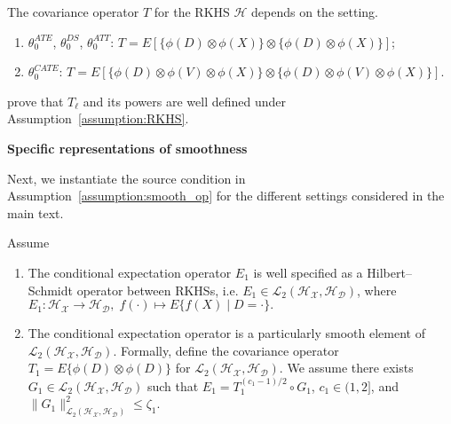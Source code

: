 \begin{remark}
The covariance operator $T$ for the RKHS $\mathcal{H}$ depends on the setting.
    \begin{enumerate}
        \item $\theta_0^{ATE}$, $\theta_0^{DS}$, $\theta_0^{ATT}$: $T=E[\{\phi(D)\otimes \phi(X)\}\otimes \{\phi(D)\otimes \phi(X)\}]$;
        \item $\theta_0^{CATE}$: $T=E[\{\phi(D)\otimes \phi(V)\otimes \phi(X)\}\otimes \{\phi(D)\otimes \phi(V)\otimes \phi(X)\}]$.
    \end{enumerate}
\end{remark}

\cite{singh2019kernel} prove that $T_{\ell}$ and its powers are well defined under Assumption~\ref{assumption:RKHS}.

\textbf{Specific representations of smoothness}

Next, we instantiate the source condition in Assumption~\ref{assumption:smooth_op} for the different settings considered in the main text.

\begin{assumption}\label{assumption:smooth_ATT}
Assume
\begin{enumerate}
\item The conditional expectation operator $E_1$ is well specified as a Hilbert--Schmidt operator between RKHSs, i.e. $E_1\in \mathcal{L}_2(\mathcal{H}_{\mathcal{X}},\mathcal{H}_{\mathcal{D}})$, where
    $
    E_1:\mathcal{H}_{\mathcal{X}} \rightarrow \mathcal{H}_{\mathcal{D}},\; f(\cdot)\mapsto E\{f(X) \mid D=\cdot\}.
    $
    \item The conditional expectation operator is a particularly smooth element of $\mathcal{L}_2(\mathcal{H}_{\mathcal{X}},\mathcal{H}_{\mathcal{D}})$. Formally, define the covariance operator $T_1=E\{\phi(D)\otimes \phi(D)\}$ for $\mathcal{L}_2(\mathcal{H}_{\mathcal{X}},\mathcal{H}_{\mathcal{D}})$.
    We assume there exists $ G_1\in \mathcal{L}_2(\mathcal{H}_{\mathcal{X}},\mathcal{H}_{\mathcal{D}})$ such that $E_1=T_1^{(c_1-1)/2}\circ G_1$, $c_1\in(1,2]$, and $\|G_1\|^2_{\mathcal{L}_2(\mathcal{H}_{\mathcal{X}},\mathcal{H}_{\mathcal{D}})}\leq\zeta_1$.
    \end{enumerate}
\end{assumption}


